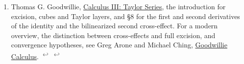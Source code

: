 \documentclass[11pt,letterpaper]{article}
\begin{document}
\begin{enumerate}[leftmargin=1.8em,label=\arabic*.,itemsep=.8em]
\item \hypertarget{note-goodwillie}{}Thomas G. Goodwillie, \href{https://arxiv.org/pdf/math/0310481}{Calculus III: Taylor Series}, the introduction for excision, cubes and Taylor layers, and §8 for the first and second derivatives of the identity and the bilinearized second cross-effect. For a modern overview, the distinction between cross-effects and full excision, and convergence hypotheses, see Greg Arone and Michael Ching, \href{https://arxiv.org/pdf/1902.00803}{Goodwillie Calculus}. \hyperlink{citation-goodwillie-1}{\textsuperscript{\(\hookleftarrow\)}} \hyperlink{citation-goodwillie-2}{\textsuperscript{\(\hookleftarrow\)}}
\end{enumerate}
\endgroup
\end{document}
